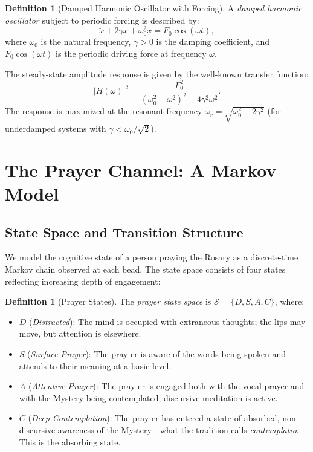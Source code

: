 \documentclass[journal]{IEEEtran}
\theoremstyle{definition}
\newtheorem{definition}[theorem]{Definition}
\theoremstyle{remark}
\begin{document}
\begin{definition}[Damped Harmonic Oscillator with Forcing]\label{def:oscillator}
A \emph{damped harmonic oscillator} subject to periodic forcing is described by:
\begin{equation}\label{eq:oscillator}
\ddot{x} + 2\gamma\dot{x} + \omega_0^2 x = F_0 \cos(\omega t),
\end{equation}
where $\omega_0$ is the natural frequency, $\gamma > 0$ is the damping coefficient, and $F_0\cos(\omega t)$ is the periodic driving force at frequency $\omega$.
\end{definition}

The steady-state amplitude response is given by the well-known transfer function:
\begin{equation}\label{eq:transfer}
|H(\omega)|^2 = \frac{F_0^2}{(\omega_0^2 - \omega^2)^2 + 4\gamma^2\omega^2}.
\end{equation}
The response is maximized at the resonant frequency $\omega_r = \sqrt{\omega_0^2 - 2\gamma^2}$ (for underdamped systems with $\gamma < \omega_0/\sqrt{2}$).

\section{The Prayer Channel: A Markov Model}\label{sec:markov}

\subsection{State Space and Transition Structure}\label{sec:states}

We model the cognitive state of a person praying the Rosary as a discrete-time Markov chain observed at each bead. The state space consists of four states reflecting increasing depth of engagement:

\begin{definition}[Prayer States]\label{def:states}
The \emph{prayer state space} is $\mathcal{S} = \{D, S, A, C\}$, where:
\begin{itemize}
\item $D$ (\emph{Distracted}): The mind is occupied with extraneous thoughts; the lips may move, but attention is elsewhere.
\item $S$ (\emph{Surface Prayer}): The pray-er is aware of the words being spoken and attends to their meaning at a basic level.
\item $A$ (\emph{Attentive Prayer}): The pray-er is engaged both with the vocal prayer and with the Mystery being contemplated; discursive meditation is active.
\item $C$ (\emph{Deep Contemplation}): The pray-er has entered a state of absorbed, non-discursive awareness of the Mystery---what the tradition calls \emph{contemplatio}. This is the absorbing state.
\end{itemize}
\end{definition}
\end{document}
